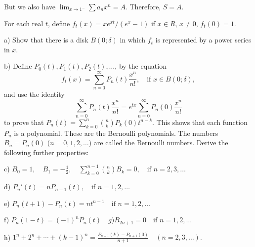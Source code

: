 But we also have \( \lim_{x \to 1^-} \sum a_n x^n = A \). Therefore, \( S = A \).

\begin{problembox}
For each real \( t \), define \( f_t(x) = xe^{xt}/(e^x - 1) \) if \( x \in R \), \( x \neq 0 \), \( f_t(0) = 1 \).

a) Show that there is a disk \( B(0; \delta) \) in which \( f_t \) is represented by a power series in \( x \).

b) Define \( P_0(t), P_1(t), P_2(t), \ldots \), by the equation
\[f_t(x) = \sum_{n=0}^\infty P_n(t) \frac{x^n}{n!}, \quad \text{if } x \in B(0; \delta),\]
and use the identity
\[\sum_{n=0}^\infty P_n(t) \frac{x^n}{n!} = e^{tx} \sum_{n=0}^\infty P_n(0) \frac{x^n}{n!}\]
to prove that \( P_n(t) = \sum_{k=0}^n \binom{n}{k} P_k(0)t^{n-k} \). This shows that each function \( P_n \) is a polynomial. These are the Bernoulli polynomials. The numbers \( B_n = P_n(0) \) (\( n = 0, 1, 2, \ldots \)) are called the Bernoulli numbers. Derive the following further properties:

c) \( B_0 = 1, \quad B_1 = -\frac{1}{2}, \quad \sum_{k=0}^{n-1} \binom{n}{k} B_k = 0, \quad \text{if } n = 2, 3, \ldots \)

d) \( P_n'(t) = nP_{n-1}(t), \quad \text{if } n = 1, 2, \ldots \)

e) \( P_n(t + 1) - P_n(t) = nt^{n-1} \quad \text{if } n = 1, 2, \ldots \)

f) \( P_n(1 - t) = (-1)^n P_n(t) \quad g) B_{2n+1} = 0 \quad \text{if } n = 1, 2, \ldots \)

h) \( 1^n + 2^n + \cdots + (k - 1)^n = \frac{P_{n+1}(k) - P_{n+1}(0)}{n + 1} \quad (n = 2, 3, \ldots ) \).
\end{problembox}

